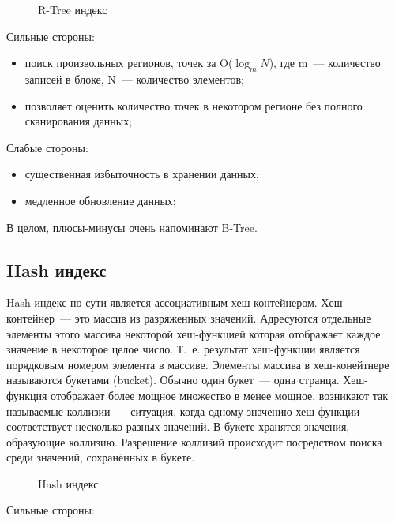 \begin{figure}[ht!]
  \caption{R-Tree индекс}
  \label{fig:rtree_index}
\end{figure}

Сильные стороны:

\begin{itemize}
  \item поиск произвольных регионов, точек за O($\log_m{N}$), где m~--- количество записей в блоке, N~--- количество элементов;
  \item позволяет оценить количество точек в некотором регионе без полного сканирования данных;
\end{itemize}

Слабые стороны:

\begin{itemize}
  \item существенная избыточность в хранении данных;
  \item медленное обновление данных;
\end{itemize}

В целом, плюсы-минусы очень напоминают B-Tree.




\subsection{Hash индекс}

Hash индекс по сути является ассоциативным хеш-контейнером. Хеш-контейнер~--- это массив из разряженных значений. Адресуются отдельные элементы этого массива некоторой хеш-функцией которая отображает каждое значение в некоторое целое число. Т.~е. результат хеш-функции является порядковым номером элемента в массиве. Элементы массива в хеш-конейтнере называются букетами (bucket). Обычно один букет~--- одна странца. Хеш-функция отображает более мощное множество в менее мощное, возникают так называемые коллизии~--- ситуация, когда одному значению хеш-функции соответствует несколько разных значений. В букете хранятся значения, образующие коллизию. Разрешение коллизий происходит посредством поиска среди значений, сохранённых в букете.

\begin{figure}[ht!]
  \caption{Hash индекс}
  \label{fig:hash_index}
\end{figure}

Сильные стороны:

